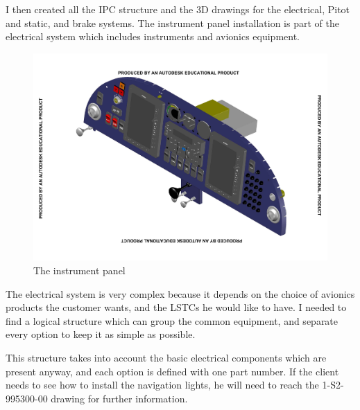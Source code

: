 \documentclass[11pt,a4paper]{article}
\begin{document}
\newpage

I then created all the IPC structure and the 3D drawings for the electrical, Pitot and static, and brake systems. The instrument panel installation is part of the electrical system which includes instruments and avionics equipment.

\begin{figure}[ht!]
	\begin{center}
		\includegraphics[width=15cm,trim = 2cm 2.2cm 2cm 2.2cm, clip]{pics/PIC016.pdf}
		\caption{The instrument panel}
		\label{fig:PIC016}
	\end{center}
\end{figure}

The electrical system is very complex because it depends on the choice of avionics products the customer wants, and the LSTCs he would like to have. I needed to find a logical structure which can group the common equipment, and separate every option to keep it as simple as possible.

\bigskip

This structure takes into account the basic electrical components which are present anyway, and each option is defined with one part number. If the client needs to see how to install the navigation lights, he will need to reach the 1-S2-995300-00 drawing for further information.
\end{document}
